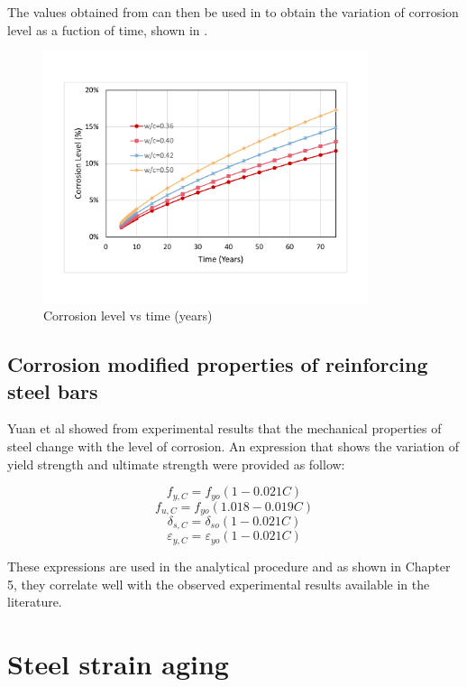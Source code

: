 The values obtained from  can then be used in  to obtain the variation of corrosion level as a fuction of time, shown in  .

\begin{figure}[htbp]
\centering
\includegraphics[width=0.85\textwidth]{Chapter-2/figs/CorrosionLevel}
\caption{Corrosion level vs time (years)}
\label{fig:CorrosionLevel_Time}
\end{figure}

\subsection{Corrosion modified properties of reinforcing steel bars}

Yuan et al \cite{Yuan2017a} showed from experimental results that the mechanical properties of steel change with the level of corrosion. An expression that shows the variation of yield strength and ultimate strength were provided as follow:

\begin{equation}
  f_{y,C}=f_{yo}(1-0.021C)
  \label{eq.eleven}
\end{equation} 
\[
  f_{u,C}=f_{yo}(1.018-0.019C)
\]
\[
  \delta_{s,C}=\delta_{so}(1-0.021C)
\]
\[
  \varepsilon_{y,C}=\varepsilon_{yo}(1-0.021C)
\]

These expressions are used in the analytical procedure and as  shown in Chapter 5, they correlate well with the observed experimental results available in the literature.

\section{Steel strain aging}

